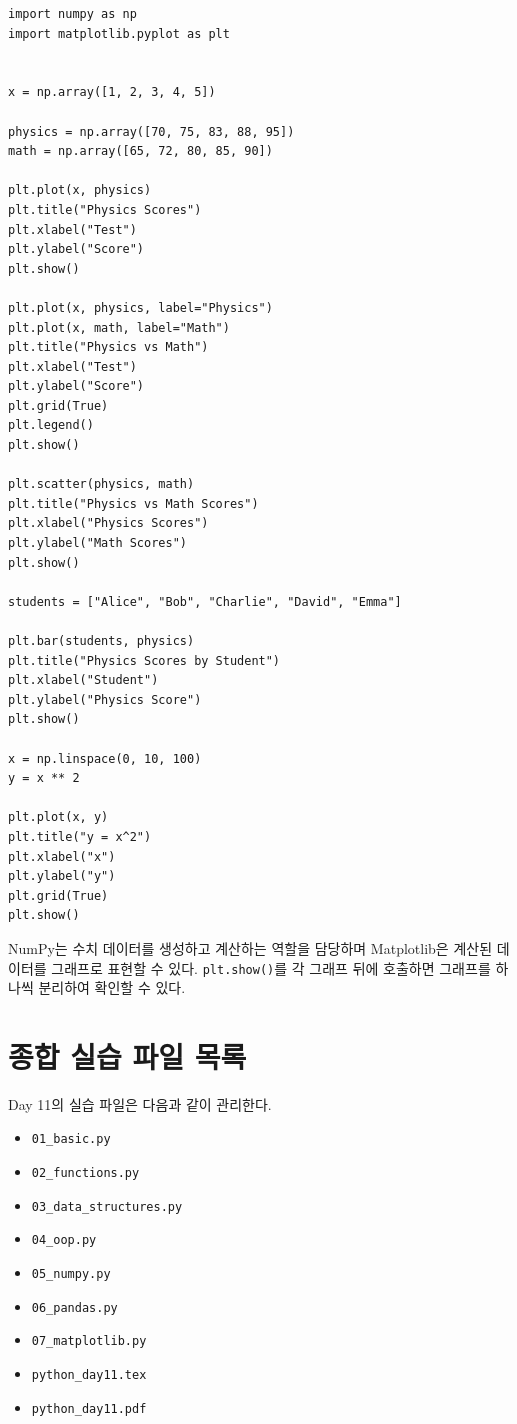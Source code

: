 \documentclass[11pt,a4paper]{article}
\begin{document}
\begin{lstlisting}
import numpy as np
import matplotlib.pyplot as plt


x = np.array([1, 2, 3, 4, 5])

physics = np.array([70, 75, 83, 88, 95])
math = np.array([65, 72, 80, 85, 90])

plt.plot(x, physics)
plt.title("Physics Scores")
plt.xlabel("Test")
plt.ylabel("Score")
plt.show()

plt.plot(x, physics, label="Physics")
plt.plot(x, math, label="Math")
plt.title("Physics vs Math")
plt.xlabel("Test")
plt.ylabel("Score")
plt.grid(True)
plt.legend()
plt.show()

plt.scatter(physics, math)
plt.title("Physics vs Math Scores")
plt.xlabel("Physics Scores")
plt.ylabel("Math Scores")
plt.show()

students = ["Alice", "Bob", "Charlie", "David", "Emma"]

plt.bar(students, physics)
plt.title("Physics Scores by Student")
plt.xlabel("Student")
plt.ylabel("Physics Score")
plt.show()

x = np.linspace(0, 10, 100)
y = x ** 2

plt.plot(x, y)
plt.title("y = x^2")
plt.xlabel("x")
plt.ylabel("y")
plt.grid(True)
plt.show()
\end{lstlisting}

\begin{importantbox}
NumPy는 수치 데이터를 생성하고 계산하는 역할을 담당하며 Matplotlib은 계산된 데이터를 그래프로 표현할 수 있다.
\texttt{plt.show()}를 각 그래프 뒤에 호출하면 그래프를 하나씩 분리하여 확인할 수 있다.
\end{importantbox}

\section{종합 실습 파일 목록}

\begin{practicebox}
Day 11의 실습 파일은 다음과 같이 관리한다.
\begin{itemize}[leftmargin=1.5em]
    \item \texttt{01\_basic.py}
    \item \texttt{02\_functions.py}
    \item \texttt{03\_data\_structures.py}
    \item \texttt{04\_oop.py}
    \item \texttt{05\_numpy.py}
    \item \texttt{06\_pandas.py}
    \item \texttt{07\_matplotlib.py}
    \item \texttt{python\_day11.tex}
    \item \texttt{python\_day11.pdf}
\end{itemize}
\end{practicebox}
\end{document}
